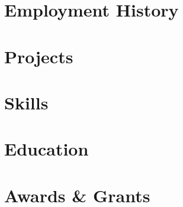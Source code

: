 \documentclass[9pt]{resume}
\begin{document}
\maketitle

\section{Employment History}






\section{Projects}












\section{Skills}










\section{Education}




\section{Awards \& Grants}



\end{document}
